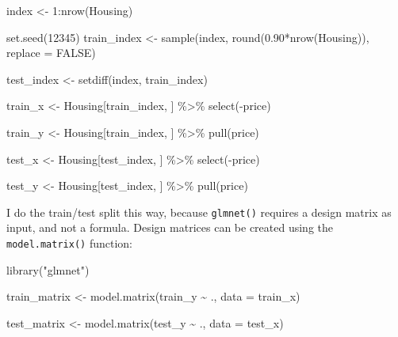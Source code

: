 \documentclass[
]{article}
\newenvironment{Shaded}{\begin{snugshade}}{\end{snugshade}}
\newcommand{\AttributeTok}[1]{\textcolor[rgb]{0.77,0.63,0.00}{#1}}
\newcommand{\ConstantTok}[1]{\textcolor[rgb]{0.00,0.00,0.00}{#1}}
\newcommand{\DecValTok}[1]{\textcolor[rgb]{0.00,0.00,0.81}{#1}}
\newcommand{\FloatTok}[1]{\textcolor[rgb]{0.00,0.00,0.81}{#1}}
\newcommand{\FunctionTok}[1]{\textcolor[rgb]{0.00,0.00,0.00}{#1}}
\newcommand{\NormalTok}[1]{#1}
\newcommand{\OtherTok}[1]{\textcolor[rgb]{0.56,0.35,0.01}{#1}}
\newcommand{\SpecialCharTok}[1]{\textcolor[rgb]{0.00,0.00,0.00}{#1}}
\newcommand{\StringTok}[1]{\textcolor[rgb]{0.31,0.60,0.02}{#1}}
\begin{document}
\begin{Shaded}
\begin{Highlighting}[]
\NormalTok{index }\OtherTok{\textless{}{-}} \DecValTok{1}\SpecialCharTok{:}\FunctionTok{nrow}\NormalTok{(Housing)}

\FunctionTok{set.seed}\NormalTok{(}\DecValTok{12345}\NormalTok{)}
\NormalTok{train\_index }\OtherTok{\textless{}{-}} \FunctionTok{sample}\NormalTok{(index, }\FunctionTok{round}\NormalTok{(}\FloatTok{0.90}\SpecialCharTok{*}\FunctionTok{nrow}\NormalTok{(Housing)), }\AttributeTok{replace =} \ConstantTok{FALSE}\NormalTok{)}

\NormalTok{test\_index }\OtherTok{\textless{}{-}} \FunctionTok{setdiff}\NormalTok{(index, train\_index)}

\NormalTok{train\_x }\OtherTok{\textless{}{-}}\NormalTok{ Housing[train\_index, ] }\SpecialCharTok{\%\textgreater{}\%} 
    \FunctionTok{select}\NormalTok{(}\SpecialCharTok{{-}}\NormalTok{price)}

\NormalTok{train\_y }\OtherTok{\textless{}{-}}\NormalTok{ Housing[train\_index, ] }\SpecialCharTok{\%\textgreater{}\%} 
    \FunctionTok{pull}\NormalTok{(price)}

\NormalTok{test\_x }\OtherTok{\textless{}{-}}\NormalTok{ Housing[test\_index, ] }\SpecialCharTok{\%\textgreater{}\%} 
    \FunctionTok{select}\NormalTok{(}\SpecialCharTok{{-}}\NormalTok{price)}

\NormalTok{test\_y }\OtherTok{\textless{}{-}}\NormalTok{ Housing[test\_index, ] }\SpecialCharTok{\%\textgreater{}\%} 
    \FunctionTok{pull}\NormalTok{(price)}
\end{Highlighting}
\end{Shaded}

I do the train/test split this way, because \texttt{glmnet()} requires a design matrix as input, and not
a formula. Design matrices can be created using the \texttt{model.matrix()} function:

\begin{Shaded}
\begin{Highlighting}[]
\FunctionTok{library}\NormalTok{(}\StringTok{"glmnet"}\NormalTok{)}

\NormalTok{train\_matrix }\OtherTok{\textless{}{-}} \FunctionTok{model.matrix}\NormalTok{(train\_y }\SpecialCharTok{\textasciitilde{}}\NormalTok{ ., }\AttributeTok{data =}\NormalTok{ train\_x)}

\NormalTok{test\_matrix }\OtherTok{\textless{}{-}} \FunctionTok{model.matrix}\NormalTok{(test\_y }\SpecialCharTok{\textasciitilde{}}\NormalTok{ ., }\AttributeTok{data =}\NormalTok{ test\_x)}
\end{Highlighting}
\end{Shaded}
\end{document}
